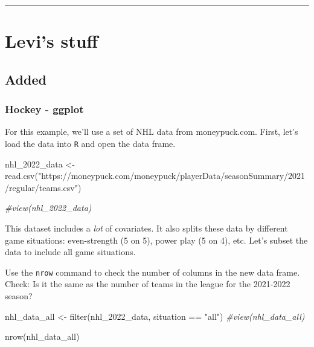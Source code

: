 \documentclass[
]{book}
\newenvironment{Shaded}{\begin{snugshade}}{\end{snugshade}}
\newcommand{\CommentTok}[1]{\textcolor[rgb]{0.56,0.35,0.01}{\textit{#1}}}
\newcommand{\FunctionTok}[1]{\textcolor[rgb]{0.00,0.00,0.00}{#1}}
\newcommand{\NormalTok}[1]{#1}
\newcommand{\OtherTok}[1]{\textcolor[rgb]{0.56,0.35,0.01}{#1}}
\newcommand{\SpecialCharTok}[1]{\textcolor[rgb]{0.00,0.00,0.00}{#1}}
\newcommand{\StringTok}[1]{\textcolor[rgb]{0.31,0.60,0.02}{#1}}
\theoremstyle{definition}
\theoremstyle{definition}
\theoremstyle{definition}
\theoremstyle{definition}
\theoremstyle{remark}
\begin{document}
\begin{center}\rule{0.5\linewidth}{0.5pt}\end{center}

\hypertarget{levis-stuff}{%
\chapter{Levi's stuff}\label{levis-stuff}}

\hypertarget{added}{%
\section{Added}\label{added}}

\hypertarget{hockey---ggplot}{%
\subsection{Hockey - ggplot}\label{hockey---ggplot}}

For this example, we'll use a set of NHL data from moneypuck.com. First, let's load the data into \texttt{R} and open the data frame.

\begin{Shaded}
\begin{Highlighting}[]
\NormalTok{nhl\_2022\_data }\OtherTok{\textless{}{-}} \FunctionTok{read.csv}\NormalTok{(}\StringTok{"https://moneypuck.com/moneypuck/playerData/seasonSummary/2021/regular/teams.csv"}\NormalTok{)}

\CommentTok{\#view(nhl\_2022\_data)}
\end{Highlighting}
\end{Shaded}

This dataset includes a \emph{lot} of covariates. It also splits these data by different game situations: even-strength (5 on 5), power play (5 on 4), etc. Let's subset the data to include all game situations.

Use the \texttt{nrow} command to check the number of columns in the new data frame. Check: Is it the same as the number of teams in the league for the 2021-2022 season?

\begin{Shaded}
\begin{Highlighting}[]
\NormalTok{nhl\_data\_all }\OtherTok{\textless{}{-}} \FunctionTok{filter}\NormalTok{(nhl\_2022\_data, situation }\SpecialCharTok{==} \StringTok{"all"}\NormalTok{)}
\CommentTok{\#view(nhl\_data\_all)}

\FunctionTok{nrow}\NormalTok{(nhl\_data\_all)}
\end{Highlighting}
\end{Shaded}
\end{document}
